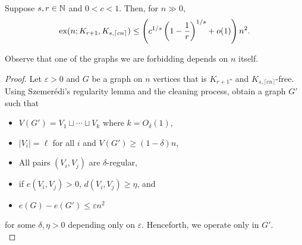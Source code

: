 			\begin{ftheo}
				Suppose $s,r\in\mathbb{N}$ and $0<c<1$. Then, for $n\gg 0$,
				\[ \operatorname{ex}(n;K_{r+1},K_{s,\lceil cn\rceil}) \le \left( c^{1/s} \left( 1 - \frac{1}{r} \right)^{1/s} + o(1) \right) n^2. \]
			\end{ftheo}

			Observe that one of the graphs we are forbidding depends on $n$ itself.

			\begin{proof}
				Let $\varepsilon > 0$ and $G$ be a graph on $n$ vertices that is $K_{r+1}$- and $K_{s,\lceil cn\rceil}$-free. Using Szemer\'{e}di's regularity lemma and the cleaning process, obtain a graph $G'$ such that
				\begin{itemize}
					\item $V(G') = V_1 \sqcup \cdots \sqcup V_k$ where $k=O_\delta(1)$,
					\item $|V_i| = \ell$ for all $i$ and $V(G') \ge (1-\delta)n$,
					\item All pairs $(V_i,V_j)$ are $\delta$-regular,
					\item if $e(V_i,V_j) > 0$, $d(V_i,V_j) \ge \eta$, and
					\item $e(G) - e(G') \le \varepsilon n^2$
				\end{itemize}
				for some $\delta,\eta > 0$ depending only on $\varepsilon$. Henceforth, we operate only in $G'$. \\


\end{proof}
